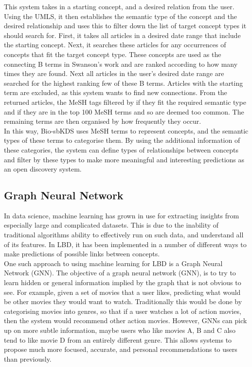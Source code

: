 \documentclass{l4proj}
\begin{document}
This system takes in a starting concept, and a desired relation from the user. Using the UMLS, it then establishes the semantic type of the concept and the desired relationship and uses this to filter down the list of target concept types it should search for. First, it takes all articles in a desired date range that include the starting concept. Next, it searches these articles for any occurrences of concepts that fit the target concept type. These concepts are used as the connecting B terms in Swanson's work and are ranked according to how many times they are found. Next all articles in the user's desired date range are searched for the highest ranking few of these B terms. Articles with the starting term are excluded, as this system wants to find new connections. From the returned articles, the MeSH tags filtered by if they fit the required semantic type and if they are in the top 100 MeSH terms and so are deemed too common. The remaining terms are then organised by how frequently they occur. \\

In this way, Bio-sbKDS uses MeSH terms to represent concepts, and the semantic types of these terms to categorise them. By using the additional information of these categories, the system can define types of relationships between concepts and filter by these types to make more meaningful and interesting predictions as an open discovery system. \\ 

\subsection{Graph Neural Network}

In data science, machine learning has grown in use for extracting insights from especially large and complicated datasets. This is due to the inability of traditional algorithms ability to effectively run on such data, and understand all of its features. In LBD, it has been implemented in a number of different ways to make predictions of possible links between concepts. \\

One such approach to using machine learning for LBD is a Graph Neural Network (GNN). The objective of a graph neural network (GNN), is to try to learn hidden or general information implied by the graph that is not obvious to see. For example, given a set of movies that a user likes, predicting what would be other movies they would want to watch. Traditionally this would be done by categorising movies into genres, so that if a user watches a lot of action movies, then the system would recommend other action movies. However, GNNs can pick up on more subtle information, maybe users who like movies A, B and C also tend to like movie D from an entirely different genre. This allows systems to propose much more focused, accurate, and personal recommendations to users than previously. \\
\end{document}
